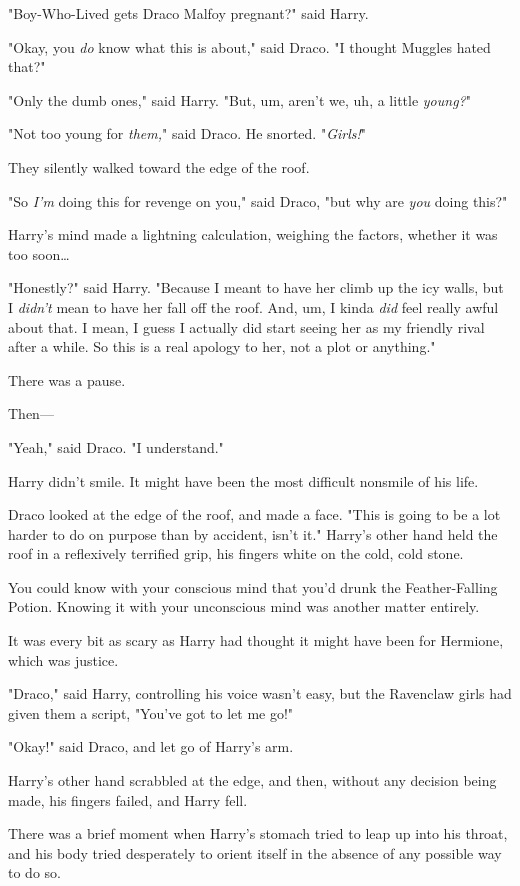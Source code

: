 "Boy-Who-Lived gets Draco Malfoy pregnant?" said Harry.

"Okay, you \emph{do} know what this is about," said Draco. "I thought Muggles 
hated that?"

"Only the dumb ones," said Harry. "But, um, aren't we, uh, a little 
\emph{young?}"

"Not too young for \emph{them,}" said Draco. He snorted. "\emph{Girls!}"

They silently walked toward the edge of the roof.

"So \emph{I'm} doing this for revenge on you," said Draco, "but why are 
\emph{you} doing this?"

Harry's mind made a lightning calculation, weighing the factors, whether it was 
too soon{\ldots}

"Honestly?" said Harry. "Because I meant to have her climb up the icy walls, 
but I \emph{didn't} mean to have her fall off the roof. And, um, I kinda 
\emph{did} feel really awful about that. I mean, I guess I actually did start 
seeing her as my friendly rival after a while. So this is a real apology to 
her, not a plot or anything."

There was a pause.

Then---

"Yeah," said Draco. "I understand."

Harry didn't smile. It might have been the most difficult nonsmile of his life.

Draco looked at the edge of the roof, and made a face. "This is going to be a 
lot harder to do on purpose than by accident, isn't it."
\sbreak
Harry's other hand held the roof in a reflexively terrified grip, his fingers 
white on the cold, cold stone.

You could know with your conscious mind that you'd drunk the Feather-Falling 
Potion. Knowing it with your unconscious mind was another matter entirely.

It was every bit as scary as Harry had thought it might have been for Hermione, 
which was justice.

"Draco," said Harry, controlling his voice wasn't easy, but the Ravenclaw girls 
had given them a script, "You've got to let me go!"

"Okay!" said Draco, and let go of Harry's arm.

Harry's other hand scrabbled at the edge, and then, without any decision being 
made, his fingers failed, and Harry fell.

There was a brief moment when Harry's stomach tried to leap up into his throat, 
and his body tried desperately to orient itself in the absence of any possible 
way to do so.

